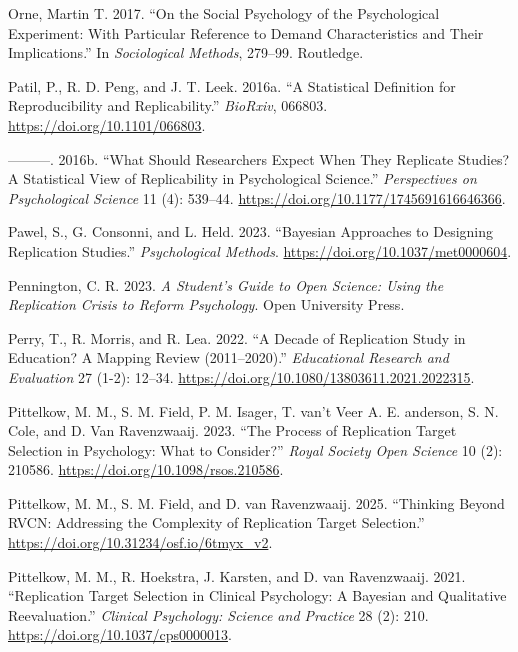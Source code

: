 \documentclass[
  letterpaper,
  DIV=11,
  openany,
  fontsize=12pt,
  parskip=half,
  headings=big,
  numbers=noenddot,
  titlepage=false]{scrreprt}
\newlength{\cslhangindent}
\newenvironment{CSLReferences}[2] %
 {\begin{list}{}{%
  \setlength{\itemindent}{0pt}
  \setlength{\leftmargin}{0pt}
  \setlength{\parsep}{0pt}
  \ifodd #1
   \setlength{\leftmargin}{\cslhangindent}
   \setlength{\itemindent}{-1\cslhangindent}
  \fi
  \setlength{\itemsep}{#2\baselineskip}}}
 {\end{list}}
\begin{document}
\begin{CSLReferences}{1}{0}
Orne, Martin T. 2017. {``On the Social Psychology of the Psychological
Experiment: With Particular Reference to Demand Characteristics and
Their Implications.''} In \emph{Sociological Methods}, 279--99.
Routledge.

Patil, P., R. D. Peng, and J. T. Leek. 2016a. {``A Statistical
Definition for Reproducibility and Replicability.''} \emph{BioRxiv},
066803. \url{https://doi.org/10.1101/066803}.

---------. 2016b. {``What Should Researchers Expect When They Replicate
Studies? A Statistical View of Replicability in Psychological
Science.''} \emph{Perspectives on Psychological Science} 11 (4):
539--44. \url{https://doi.org/10.1177/1745691616646366}.

Pawel, S., G. Consonni, and L. Held. 2023. {``Bayesian Approaches to
Designing Replication Studies.''} \emph{Psychological Methods}.
\url{https://doi.org/10.1037/met0000604}.

Pennington, C. R. 2023. \emph{A Student's Guide to Open Science: Using
the Replication Crisis to Reform Psychology}. Open University Press.

Perry, T., R. Morris, and R. Lea. 2022. {``A Decade of Replication Study
in Education? A Mapping Review (2011--2020).''} \emph{Educational
Research and Evaluation} 27 (1-2): 12--34.
\url{https://doi.org/10.1080/13803611.2021.2022315}.

Pittelkow, M. M., S. M. Field, P. M. Isager, T. van't Veer A. E.
anderson, S. N. Cole, and D. Van Ravenzwaaij. 2023. {``The Process of
Replication Target Selection in Psychology: What to Consider?''}
\emph{Royal Society Open Science} 10 (2): 210586.
\url{https://doi.org/10.1098/rsos.210586}.

Pittelkow, M. M., S. M. Field, and D. van Ravenzwaaij. 2025. {``Thinking
Beyond RVCN: Addressing the Complexity of Replication Target
Selection.''} \url{https://doi.org/10.31234/osf.io/6tmyx_v2}.

Pittelkow, M. M., R. Hoekstra, J. Karsten, and D. van Ravenzwaaij. 2021.
{``Replication Target Selection in Clinical Psychology: A Bayesian and
Qualitative Reevaluation.''} \emph{Clinical Psychology: Science and
Practice} 28 (2): 210. \url{https://doi.org/10.1037/cps0000013}.


\end{CSLReferences}
\end{document}
